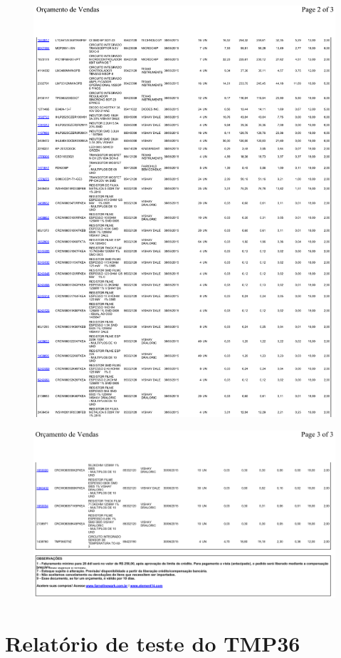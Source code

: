 \documentclass[
	12pt,				%
	openright,			%
	oneside,			%
	a4paper,			%
	english,			%
	french,				%
	spanish,			%
	brazil,				%
	oldfontcommands
	]{abntex2}
\begin{document}
\begin{anexosenv}
	\begin{figure}[th]
		\centering
		\includegraphics[width=0.9\linewidth]{./anexos/Pedido1898452}	
	\end{figure}
	
	\begin{figure}[th]
		\centering
		\includegraphics[width=0.9\linewidth]{./anexos/Pedido1898453}	
	\end{figure}
	
\chapter[Relatório de teste do TMP36]{Relatório de teste do TMP36} \label{TMP36}
	

\end{anexosenv}
\end{document}
